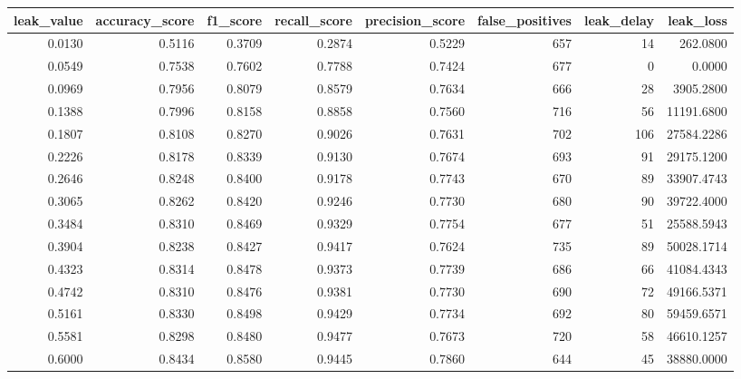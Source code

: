\begin{tabular}{rrrrrrrr}
\toprule
leak\_value & accuracy\_score & f1\_score & recall\_score & precision\_score & false\_positives & leak\_delay & leak\_loss \\
\midrule
0.0130 & 0.5116 & 0.3709 & 0.2874 & 0.5229 & 657 & 14 & 262.0800 \\
0.0549 & 0.7538 & 0.7602 & 0.7788 & 0.7424 & 677 & 0 & 0.0000 \\
0.0969 & 0.7956 & 0.8079 & 0.8579 & 0.7634 & 666 & 28 & 3905.2800 \\
0.1388 & 0.7996 & 0.8158 & 0.8858 & 0.7560 & 716 & 56 & 11191.6800 \\
0.1807 & 0.8108 & 0.8270 & 0.9026 & 0.7631 & 702 & 106 & 27584.2286 \\
0.2226 & 0.8178 & 0.8339 & 0.9130 & 0.7674 & 693 & 91 & 29175.1200 \\
0.2646 & 0.8248 & 0.8400 & 0.9178 & 0.7743 & 670 & 89 & 33907.4743 \\
0.3065 & 0.8262 & 0.8420 & 0.9246 & 0.7730 & 680 & 90 & 39722.4000 \\
0.3484 & 0.8310 & 0.8469 & 0.9329 & 0.7754 & 677 & 51 & 25588.5943 \\
0.3904 & 0.8238 & 0.8427 & 0.9417 & 0.7624 & 735 & 89 & 50028.1714 \\
0.4323 & 0.8314 & 0.8478 & 0.9373 & 0.7739 & 686 & 66 & 41084.4343 \\
0.4742 & 0.8310 & 0.8476 & 0.9381 & 0.7730 & 690 & 72 & 49166.5371 \\
0.5161 & 0.8330 & 0.8498 & 0.9429 & 0.7734 & 692 & 80 & 59459.6571 \\
0.5581 & 0.8298 & 0.8480 & 0.9477 & 0.7673 & 720 & 58 & 46610.1257 \\
0.6000 & 0.8434 & 0.8580 & 0.9445 & 0.7860 & 644 & 45 & 38880.0000 \\
\bottomrule
\end{tabular}
